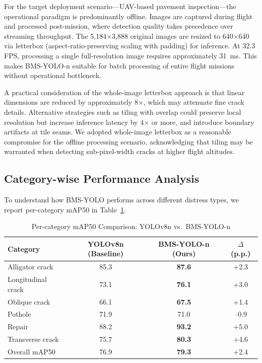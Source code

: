 \documentclass{ieeeaccess}
\begin{document}
For the target deployment scenario---UAV-based pavement inspection---the operational paradigm is predominantly offline. Images are captured during flight and processed post-mission, where detection quality takes precedence over streaming throughput. The 5,184$\times$3,888 original images are resized to 640$\times$640 via letterbox (aspect-ratio-preserving scaling with padding) for inference. At 32.3 FPS, processing a single full-resolution image requires approximately 31~ms. This makes BMS-YOLO-n suitable for batch processing of entire flight missions without operational bottleneck.

A practical consideration of the whole-image letterbox approach is that linear dimensions are reduced by approximately 8$\times$, which may attenuate fine crack details. Alternative strategies such as tiling with overlap could preserve local resolution but increase inference latency by 4$\times$ or more, and introduce boundary artifacts at tile seams. We adopted whole-image letterbox as a reasonable compromise for the offline processing scenario, acknowledging that tiling may be warranted when detecting sub-pixel-width cracks at higher flight altitudes.

\subsection{Category-wise Performance Analysis}

To understand how BMS-YOLO performs across different distress types, we report per-category mAP50 in Table~\ref{tab:category}.

\begin{table}[!t]
\caption{Per-category mAP50 Comparison: YOLOv8n vs.\ BMS-YOLO-n}
\label{tab:category}
\centering
\setlength{\tabcolsep}{4pt}
\begin{tabular}{lccc}
\toprule
Category & YOLOv8n (Baseline) & BMS-YOLO-n (Ours) & $\Delta$ (p.p.) \\
\midrule
Alligator crack    & 85.3 & \textbf{87.6} & +2.3 \\
Longitudinal crack & 73.1 & \textbf{76.1} & +3.0 \\
Oblique crack      & 66.1 & \textbf{67.5} & +1.4 \\
Pothole            & 71.9 & 71.0 & --0.9 \\
Repair             & 88.2 & \textbf{93.2} & +5.0 \\
Transverse crack   & 75.7 & \textbf{80.3} & +4.6 \\
\midrule
Overall mAP50 & 76.9 & \textbf{79.3} & +2.4 \\
\bottomrule
\end{tabular}
\end{table}
\end{document}
